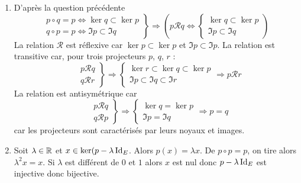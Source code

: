 \begin{enumerate}
\begin{enumerate}
  \item D'après la question précédente
\begin{displaymath}
\left. 
\begin{aligned}
  p\circ q = p \Leftrightarrow \ker q \subset \ker p \\
  q\circ p = p \Leftrightarrow \Im p \subset \Im q
\end{aligned}
\right\rbrace 
\Rightarrow
\left( 
  p \mathcal{R} q \Leftrightarrow
  \left\lbrace 
  \begin{aligned}
    \ker q \subset \ker p \\ \Im p \subset \Im q
  \end{aligned}
\right. 
\right) 
\end{displaymath}
La relation $\mathcal{R}$ est réflexive car $\ker p \subset \ker p$ et $\Im p \subset \Im p$.\newline
La relation est transitive car, pour trois projecteurs $p$, $q$, $r$ :
\begin{displaymath}
\left. 
\begin{aligned}
&p\mathcal{R} q \\ &q \mathcal{R} r
\end{aligned}
\right\rbrace 
\Rightarrow
\left\lbrace 
  \begin{aligned}
    \ker r \subset \ker q \subset \ker p \\
    \Im p \subset \Im q \subset \Im r
  \end{aligned}
\right. 
\Rightarrow p\mathcal{R} r
\end{displaymath}
La relation est antisymétrique car
\begin{displaymath}
\left. 
\begin{aligned}
&p\mathcal{R} q \\ &q \mathcal{R} p
\end{aligned}
\right\rbrace 
\Rightarrow
\left\lbrace 
  \begin{aligned}
    \ker q = \ker p \\
    \Im p = \Im q 
  \end{aligned}  
\right. \Rightarrow p = q
\end{displaymath}
car les projecteurs sont caractérisés par leurs noyaux et images.
  \item Soit $\lambda \in \mathbb{R}$ et $x\in \ker(p-\lambda \operatorname{Id}_E$. Alors $p(x)=\lambda x$. De $p\circ p =p$, on tire alors $\lambda^2x =x$. Si $\lambda$ est différent de $0$ et $1$ alors $x$ est nul donc $p-\lambda \operatorname{Id}_E$ est injective donc bijective. 
\end{enumerate}
  

\end{enumerate}
